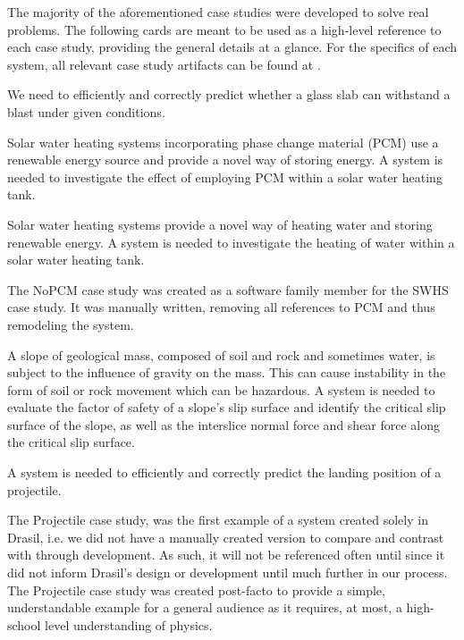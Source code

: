 The majority of the aforementioned case studies were developed to solve real
problems. The following cards are meant to be used as a high-level reference to 
each case study, providing the general details at a glance. For the specifics 
of each system, all relevant case study artifacts can be found at .

\card{\gb}
{We need to efficiently and correctly predict whether a glass 
slab can withstand a blast under given conditions.}
{}

\card{\sw}
{Solar water heating systems incorporating phase change 
 material (PCM) use a renewable energy source and provide a novel way of 
 storing energy. A system is needed to investigate the effect of employing PCM
 within a solar water heating tank.}
{}

\card{\np}
{Solar water heating systems provide a novel way of 
heating water and storing renewable energy. A system is needed to investigate
the heating of water within a solar water heating tank.}
{}

The NoPCM case study was created as a software family member for the SWHS case
study. It was manually written, removing all references to PCM and thus 
remodeling the system.

\card{\sp}
{A slope of geological mass, composed of soil and rock 
 and sometimes water, is subject to the influence of gravity on the mass. 
 This can cause instability in the form of soil or rock movement which can
 be hazardous. A system is needed to evaluate the factor of safety of 
 a slope's slip surface and identify the critical slip surface of the slope, 
 as well as the interslice normal force and shear force along the critical 
 slip surface.}
{}

\card{\pr}
{A system is needed to efficiently and correctly predict
 the landing position of a projectile.}
{}

The Projectile case study, was the first example of a system 
created solely in Drasil, i.e. we did not have a manually created version to 
compare and contrast with through development. As such, it will not be 
referenced often until  since it did not inform Drasil's 
design or development until much further in our process. The Projectile case 
study was created post-facto to provide a simple, understandable example for a 
general audience as it requires, at most, a high-school level understanding of 
physics. 

